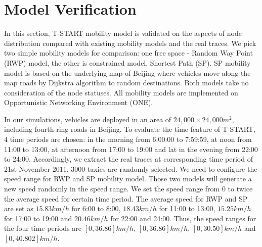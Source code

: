 \section{Model Verification}
\label{section_model_varification}

In this section, T-START mobility model is validated on the aspects of node distribution compared with existing mobility models and the real traces. We pick two simple mobility models for comparison: one free space - Random Way Point (RWP) model, the other is constrained model, Shortest Path (SP).  SP mobility model is based on the underlying map of Beijing where vehicles move along the map roads by Dijkstra algorithm to random destinations. Both models take no consideration of the node statuses. All mobility models are implemented on Opportunistic Networking Environment (ONE)\cite{KeranenOtt-155}.

In our simulations, vehicles are deployed in an area of $24,000\times 24,000 m^2$, including fourth ring roads in Beijing.
To evaluate the time feature of T-START, 4 time periods are chosen: in the morning from 6:00:00 to 7:59:59, at noon from 11:00 to 13:00, at afternoon from 17:00 to 19:00 and lat in the evening from 22:00 to 24:00. Accordingly, we extract the real traces at corresponding time period of 21st November 2011.
3000 taxies are randomly selected. 
We need to configure the speed range for RWP and SP mobility model. Those two models will generate a new speed randomly in the speed range. We set the speed range from 0 to twice the average speed for certain time period.
The average speed for RWP and SP are set as $15.83km/h$ for 6:00 to 8:00, $18.43km/h$ for 11:00 to 13:00, $15.25km/h$ for 17:00 to 19:00 and $20.46km/h$ for 22:00 and 24:00. 
Thus, the speed ranges for the four time periods are $[0, 36.86]km/h$, $[0, 36.86]km/h$, $[0, 30.50]km/h$ and $[0, 40.802]km/h$.

